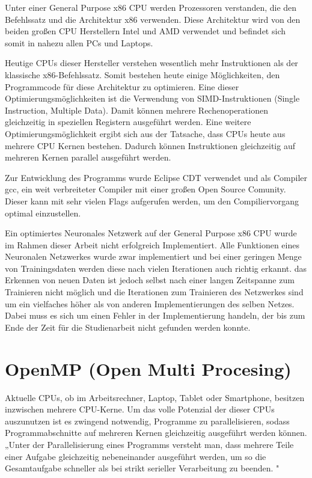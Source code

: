 \documentclass[../main.tex]{subfiles}
\begin{document}
Unter einer General Purpose x86 CPU werden Prozessoren verstanden, die den Befehlssatz und die Architektur x86 verwenden. Diese Architektur wird von den beiden großen CPU Herstellern Intel und AMD verwendet und befindet sich somit in nahezu allen PCs und Laptops. 

Heutige CPUs dieser Hersteller verstehen wesentlich mehr Instruktionen als der klassische x86-Befehlssatz. Somit bestehen heute einige Möglichkeiten, den Programmcode für diese Architektur zu optimieren. Eine dieser Optimierungsmöglichkeiten ist die Verwendung von SIMD-Instruktionen (Single Instruction, Multiple Data). Damit können mehrere Rechenoperationen gleichzeitig in speziellen Registern ausgeführt werden.
Eine weitere Optimierungsmöglichkeit ergibt sich aus der Tatsache,  dass CPUs heute aus mehrere CPU Kernen bestehen. Dadurch können Instruktionen gleichzeitig auf mehreren Kernen parallel ausgeführt werden.

Zur Entwicklung des Programms wurde Eclipse CDT verwendet und als Compiler gcc, ein weit verbreiteter Compiler mit einer großen Open Source Comunity. Dieser kann mit sehr vielen Flags aufgerufen werden, um den Compiliervorgang optimal einzustellen.

Ein optimiertes Neuronales Netzwerk auf der General Purpose x86 CPU wurde im Rahmen dieser Arbeit nicht erfolgreich Implementiert. Alle Funktionen eines Neuronalen Netzwerkes wurde zwar implementiert und bei einer geringen Menge von Trainingsdaten werden diese nach vielen Iterationen auch richtig erkannt. das Erkennen von neuen Daten ist jedoch selbst nach einer langen Zeitspanne zum Trainieren nicht möglich und die Iterationen zum Trainieren des Netzwerkes sind um ein vielfaches höher als von anderen Implementierungen des selben Netzes. Dabei muss es sich um einen Fehler in der Implementierung handeln, der bis zum Ende der Zeit für die Studienarbeit nicht gefunden werden konnte. 

\section{OpenMP (Open Multi Procesing)}

Aktuelle CPUs, ob im Arbeitsrechner, Laptop, Tablet oder Smartphone, besitzen inzwischen mehrere CPU-Kerne. Um das volle Potenzial der dieser CPUs auszunutzen ist es zwingend notwendig, Programme zu parallelisieren, sodass Programmabschnitte auf mehreren Kernen gleichzeitig ausgeführt werden können.
„Unter der Parallelisierung eines Programms versteht man, dass mehrere Teile einer Aufgabe gleichzeitig nebeneinander ausgeführt werden, um so die Gesamtaufgabe schneller als bei strikt serieller Verarbeitung zu beenden. \cite{articleOpenMP}"
\end{document}
